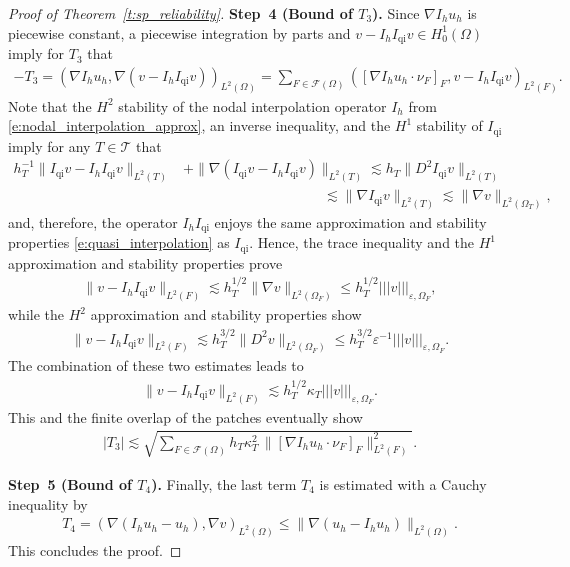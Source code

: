 \documentclass[10pt,a4paper]{amsart}
\newcommand{\ennorm}[1]{\lvert\!\lvert\!\lvert #1 \rvert\!\rvert\!\rvert}
\newcommand{\tri}{\mathcal{T}}
\begin{document}
\begin{proof}[Proof of Theorem~\ref{t:sp_reliability}]
    \textbf{Step~4 (Bound of $T_3$).}
    Since $\nabla I_h u_h$ is piecewise constant, a piecewise integration
    by parts and $v-I_hI_\mathrm{qi}v\in H^1_0(\Omega)$ 
    imply for $T_3$ that
    \begin{align*}
        -T_3=
        (\nabla I_h u_h,\nabla (v-I_h I_\mathrm{qi} v))_{L^2(\Omega)}
        = \sum_{F\in\mathcal{F}(\Omega)}
          ([\nabla I_h u_h\cdot\nu_F]_F, v-I_h I_\mathrm{qi} v)_{L^2(F)}.
    \end{align*}
    Note that the $H^2$ stability of the nodal interpolation 
    operator $I_h$ from \eqref{e:nodal_interpolation_approx},
    an inverse inequality, and the $H^1$ stability of $I_\mathrm{qi}$ 
    imply for any $T\in\tri$ that 
    \begin{align*}
        h_T^{-1}\lVert I_\mathrm{qi} v-I_h I_\mathrm{qi}v\rVert_{L^2(T)} 
        &+ \lVert \nabla(I_\mathrm{qi} v-I_h I_\mathrm{qi}v)\rVert_{L^2(T)}
        \lesssim h_T \lVert D^2 I_\mathrm{qi} v\rVert_{L^2(T)} \\
        &\qquad\qquad\qquad \qquad\qquad
        \lesssim \lVert \nabla I_\mathrm{qi} v\rVert_{L^2(T)} 
        \lesssim \lVert \nabla  v\rVert_{L^2(\Omega_T)},
    \end{align*}
    and, therefore, the operator $I_h I_\mathrm{qi}$ enjoys the 
    same approximation and stability properties 
    \eqref{e:quasi_interpolation} as $I_\mathrm{qi}$.
    Hence, the trace inequality and the 
    $H^1$ approximation and stability properties prove 
    \begin{align*}
        \lVert v-I_h I_\mathrm{qi}v\rVert_{L^2(F)}
        \lesssim h_T^{1/2}\lVert \nabla v\rVert_{L^2(\Omega_F)}
        \leq h_T^{1/2} \ennorm{v}_{\varepsilon, \Omega_F},
    \end{align*}
   while the $H^2$ approximation and stability properties show 
    \begin{align*}
        \lVert v-I_h I_\mathrm{qi}v\rVert_{L^2(F)}
        \lesssim h_T^{3/2}\lVert D^2 v\rVert_{L^2(\Omega_F)}
        \leq h_T^{3/2}\varepsilon^{-1} \ennorm{v}_{\varepsilon, \Omega_F}.
    \end{align*}
    The combination of these two estimates leads to 
    \begin{align*}
        \lVert v-I_h I_\mathrm{qi}v\rVert_{L^2(F)}
        \lesssim h_T^{1/2}\kappa_T \ennorm{v}_{\varepsilon, \Omega_F}.
    \end{align*}
    This and the finite overlap of the patches
    eventually show
    \begin{align*}
        |T_3|
        \lesssim  \sqrt{\sum_{F\in\mathcal{F}(\Omega)}
          h_T\kappa_T^2
          \,\lVert [\nabla I_h u_h\cdot\nu_F]_F\rVert_{L^2(F)}^2}
          .
    \end{align*}
    
    \textbf{Step~5 (Bound of $T_4$).}
    Finally, the last term $T_4$
    is estimated with a Cauchy inequality by
    \begin{align*}
       T_4= (\nabla (I_h u_h-u_h),\nabla  v)_{L^2(\Omega)}
        \leq \lVert \nabla (u_h-I_h u_h)\rVert_{L^2(\Omega)} .
    \end{align*}
    This concludes the proof.
\end{proof}
\end{document}
